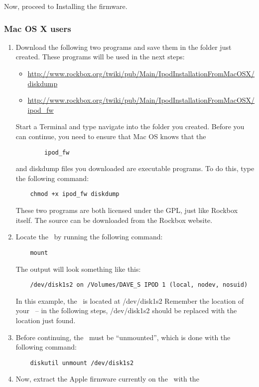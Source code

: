 Now, proceed to  Installing the firmware.

\subsubsection{Mac OS X users}
\begin{enumerate}
  \item Download the following two programs and save them in the folder just
    created. These programs will be used in the next steps:
    \begin{itemize}
      \item \url{http://www.rockbox.org/twiki/pub/Main/IpodInstallationFromMacOSX/diskdump}
      \item \url{http://www.rockbox.org/twiki/pub/Main/IpodInstallationFromMacOSX/ipod_fw}
    \end{itemize}
    Start a Terminal and type navigate into the folder you created. Before
    you can continue, you need to ensure that Mac OS knows that the
    \begin{verbatim}
    	ipod_fw
    \end{verbatim}
    and diskdump files you downloaded are executable programs. To do this,
    type the following command:
    \begin{verbatim}
    chmod +x ipod_fw diskdump
    \end{verbatim}
    These two programs are both licensed under the GPL, just like Rockbox
    itself. The source can be downloaded from the Rockbox website.
  \item Locate the \dap\ by running the following command:
    \begin{verbatim}
    mount
    \end{verbatim}
    The output will look something like this: 
    \begin{verbatim}
    /dev/disk1s2 on /Volumes/DAVE_S IPOD 1 (local, nodev, nosuid)
    \end{verbatim}
    In this example, the \dap\ is located at /dev/disk1s2 Remember the 
    location of your \dap\  -- in the following steps, /dev/disk1s2 should be
    replaced with the location just found.
  \item Before continuing, the \dap\ must be ``unmounted'', which is
    done with the following command:
    \begin{verbatim}
    diskutil unmount /dev/disk1s2
    \end{verbatim}
  \item Now, extract the Apple firmware currently on the \dap\ with the

\end{enumerate}

